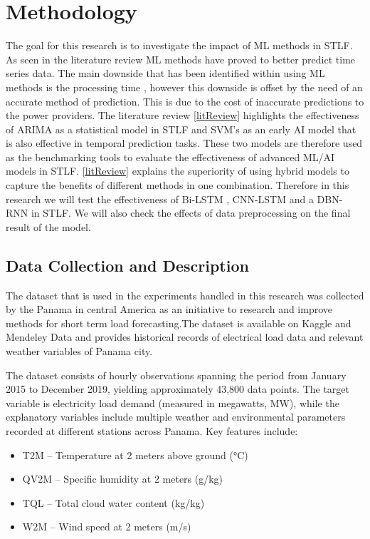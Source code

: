 \chapter{Methodology}

The goal for this research is to investigate the impact of ML methods in STLF. As seen in the literature review ML methods have proved to better predict time series data. The main downside that has been identified within using ML methods is the processing time , however this downside is offset by the need of an accurate method of prediction. This is due to the cost of inaccurate predictions to the power providers. The literature review \ref{litReview} highlights the effectiveness of ARIMA as a statistical model in STLF and SVM's as an early AI model that is also effective in temporal prediction tasks. These two models are therefore used as the benchmarking tools to evaluate the effectiveness of advanced ML/AI models in STLF. \ref{litReview} explains the superiority of using hybrid models to capture the benefits of different methods in one combination. Therefore in this research we will test the effectiveness of Bi-LSTM , CNN-LSTM and a DBN-RNN in STLF. We will also check the effects of data preprocessing on the final result of the model.

\section{Data Collection and Description}
The dataset that is used in the experiments handled in this research was collected by the Panama in central America as an initiative to research and improve  methods for short term load forecasting.The dataset is available on Kaggle and  Mendeley Data and provides historical records of electrical load data and relevant weather variables of Panama city\cite{dataset}.

The dataset consists of hourly observations spanning the period from January 2015 to December 2019, yielding approximately 43,800 data points. The target variable is electricity load demand (measured in megawatts, MW), while the explanatory variables include multiple weather and environmental parameters recorded at different stations across Panama. Key features include:
\begin{itemize}
	\item T2M – Temperature at 2 meters above ground (°C)
	\item QV2M – Specific humidity at 2 meters (g/kg)
	\item TQL – Total cloud water content (kg/kg)
	\item W2M – Wind speed at 2 meters (m/s)
	
\end{itemize}

